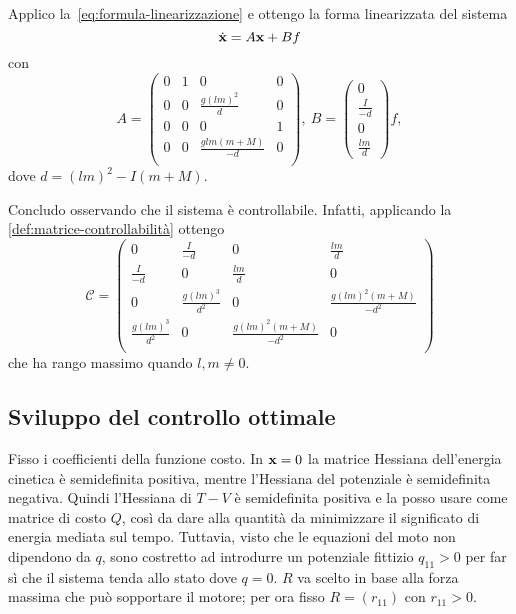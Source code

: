 Applico la~\eqref{eq:formula-linearizzazione} e ottengo la forma linearizzata
del sistema
\begin{equation*}
        \dot {\mathbf{x}} = A\mathbf{x} + Bf \\
\end{equation*}
con
\begin{equation*}
    A = \left(
            \begin{array}{cccc}
                0&1&0&0\\
                0&0&\frac{g(lm)^2}{d}&0\\
                0&0&0&1\\
                0&0&\frac{glm(m+M)}{-d}&0\\
            \end{array}
        \right),\
    B = \left(\begin{array}{c}0\\\frac{I}{-d}\\0\\\frac{lm}{d}\end{array}\right)f,
\end{equation*}
dove $d = (lm)^2-I(m+M)$.

Concludo osservando che il sistema è controllabile.
Infatti, applicando la \autoref{def:matrice-controllabilità}
ottengo
\begin{equation*}
    \mathcal C = \left(
        \begin{array}{cccc}
            0&\frac I {-d}&0&\frac{lm} d\\
            \frac I {-d}&0&\frac{lm} d&0\\
            0&\frac{g(lm)^3}{d^2}&0&\frac{g(lm)^2(m+M)}{-d^2}\\
            \frac{g(lm)^3}{d^2}&0&\frac{g(lm)^2(m+M)}{-d^2}&0\\
        \end{array}
        \right)
\end{equation*}
che ha rango massimo quando $l, m \neq 0$.

\subsection{Sviluppo del controllo ottimale}
Fisso i coefficienti della funzione costo.
In $\mathbf{x} = 0$ la matrice Hessiana dell'energia cinetica è
semidefinita positiva, mentre l'Hessiana del potenziale è
semidefinita negativa.
Quindi l'Hessiana di $T - V$ è semidefinita positiva e
la posso usare come matrice di costo $Q$,
così da dare alla quantità
da minimizzare il significato di energia mediata sul tempo.
Tuttavia, visto che le equazioni del moto non dipendono da $q$,
sono costretto ad introdurre un potenziale fittizio
$q_{11} > 0$ per far sì che il sistema tenda allo
stato dove $q = 0$.
$R$ va scelto in base alla forza massima che può sopportare
il motore; per ora fisso $R = (r_{11})$ con $r_{11} > 0$.

